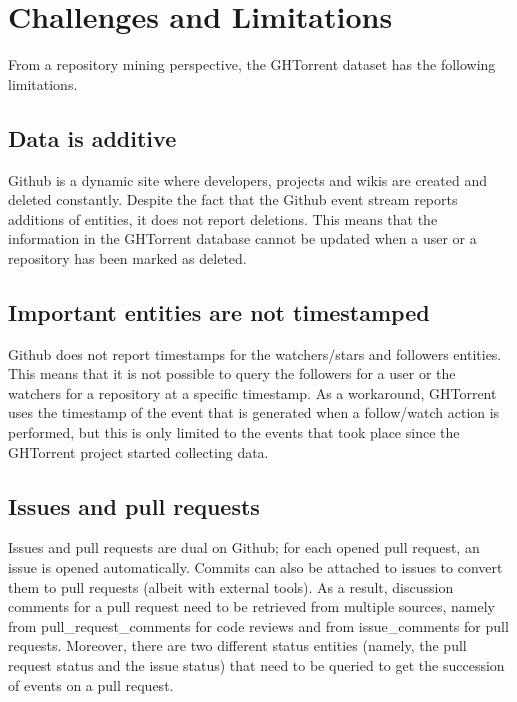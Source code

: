 \documentclass[conference]{IEEEtran}
\begin{document}
\section{Challenges and Limitations}

From a repository mining perspective, the GHTorrent dataset has the following
limitations. 

\subsection{Data is additive} Github is a dynamic site where developers, 
    projects and wikis are created and deleted constantly. Despite the fact
    that the Github event stream reports additions of entities, it does
    not report deletions. This means that the information in the GHTorrent 
    database cannot be updated when a user or a repository has been marked
    as deleted.

\subsection{Important entities are not timestamped}
\label{chal:timestamp}
Github does not report
    timestamps for the watchers/stars and followers entities. This means that it
    is not possible to query the followers for a user or the watchers for a
    repository at a specific timestamp. As a workaround, GHTorrent uses the
    timestamp of the event that is generated when a follow/watch action is
    performed, but this is only limited to the events that took place since
    the GHTorrent project started collecting data.


\subsection{Issues and pull requests} Issues and pull requests are dual on
Github; for each opened pull request, an issue is opened automatically.  Commits
can also be attached to issues to convert them to pull requests (albeit with
external tools). As a result, discussion comments for a pull request need to be
retrieved from multiple sources, namely from {\sf pull\_request\_comments} for
code reviews and from {\sf issue\_comments} for pull requests. Moreover, there
are two different status entities (namely, the pull request status and the issue
status) that need to be queried to get the succession of events on a pull
request.
\end{document}
